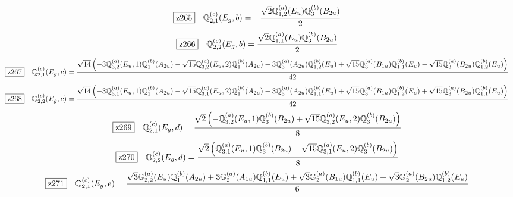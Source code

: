 \documentclass[fleqn,10pt,landscape]{jsarticle}
\begin{document}
\begin{dmath*}
\hspace*{3mm}\fbox{z265}\quad \mathbb{Q}_{2,1}^{(c)}(E_{g},b)=- \frac{\sqrt{2} \mathbb{Q}_{1,2}^{(a)}(E_{u}) \mathbb{Q}_{3}^{(b)}(B_{2u})}{2}
\end{dmath*}
\begin{dmath*}
\hspace*{3mm}\fbox{z266}\quad \mathbb{Q}_{2,2}^{(c)}(E_{g},b)=\frac{\sqrt{2} \mathbb{Q}_{1,1}^{(a)}(E_{u}) \mathbb{Q}_{3}^{(b)}(B_{2u})}{2}
\end{dmath*}
\begin{dmath*}
\hspace*{3mm}\fbox{z267}\quad \mathbb{Q}_{2,1}^{(c)}(E_{g},c)=\frac{\sqrt{14} \left(- 3 \mathbb{Q}_{3,2}^{(a)}(E_{u},1) \mathbb{Q}_{1}^{(b)}(A_{2u}) - \sqrt{15} \mathbb{Q}_{3,2}^{(a)}(E_{u},2) \mathbb{Q}_{1}^{(b)}(A_{2u}) - 3 \mathbb{Q}_{3}^{(a)}(A_{2u}) \mathbb{Q}_{1,2}^{(b)}(E_{u}) + \sqrt{15} \mathbb{Q}_{3}^{(a)}(B_{1u}) \mathbb{Q}_{1,1}^{(b)}(E_{u}) - \sqrt{15} \mathbb{Q}_{3}^{(a)}(B_{2u}) \mathbb{Q}_{1,2}^{(b)}(E_{u})\right)}{42}
\end{dmath*}
\begin{dmath*}
\hspace*{3mm}\fbox{z268}\quad \mathbb{Q}_{2,2}^{(c)}(E_{g},c)=\frac{\sqrt{14} \left(- 3 \mathbb{Q}_{3,1}^{(a)}(E_{u},1) \mathbb{Q}_{1}^{(b)}(A_{2u}) - \sqrt{15} \mathbb{Q}_{3,1}^{(a)}(E_{u},2) \mathbb{Q}_{1}^{(b)}(A_{2u}) - 3 \mathbb{Q}_{3}^{(a)}(A_{2u}) \mathbb{Q}_{1,1}^{(b)}(E_{u}) + \sqrt{15} \mathbb{Q}_{3}^{(a)}(B_{1u}) \mathbb{Q}_{1,2}^{(b)}(E_{u}) + \sqrt{15} \mathbb{Q}_{3}^{(a)}(B_{2u}) \mathbb{Q}_{1,1}^{(b)}(E_{u})\right)}{42}
\end{dmath*}
\begin{dmath*}
\hspace*{3mm}\fbox{z269}\quad \mathbb{Q}_{2,1}^{(c)}(E_{g},d)=\frac{\sqrt{2} \left(- \mathbb{Q}_{3,2}^{(a)}(E_{u},1) \mathbb{Q}_{3}^{(b)}(B_{2u}) + \sqrt{15} \mathbb{Q}_{3,2}^{(a)}(E_{u},2) \mathbb{Q}_{3}^{(b)}(B_{2u})\right)}{8}
\end{dmath*}
\begin{dmath*}
\hspace*{3mm}\fbox{z270}\quad \mathbb{Q}_{2,2}^{(c)}(E_{g},d)=\frac{\sqrt{2} \left(\mathbb{Q}_{3,1}^{(a)}(E_{u},1) \mathbb{Q}_{3}^{(b)}(B_{2u}) - \sqrt{15} \mathbb{Q}_{3,1}^{(a)}(E_{u},2) \mathbb{Q}_{3}^{(b)}(B_{2u})\right)}{8}
\end{dmath*}
\begin{dmath*}
\hspace*{3mm}\fbox{z271}\quad \mathbb{Q}_{2,1}^{(c)}(E_{g},e)=\frac{\sqrt{3} \mathbb{G}_{2,2}^{(a)}(E_{u}) \mathbb{Q}_{1}^{(b)}(A_{2u}) + 3 \mathbb{G}_{2}^{(a)}(A_{1u}) \mathbb{Q}_{1,1}^{(b)}(E_{u}) + \sqrt{3} \mathbb{G}_{2}^{(a)}(B_{1u}) \mathbb{Q}_{1,1}^{(b)}(E_{u}) + \sqrt{3} \mathbb{G}_{2}^{(a)}(B_{2u}) \mathbb{Q}_{1,2}^{(b)}(E_{u})}{6}
\end{dmath*}
\end{document}
